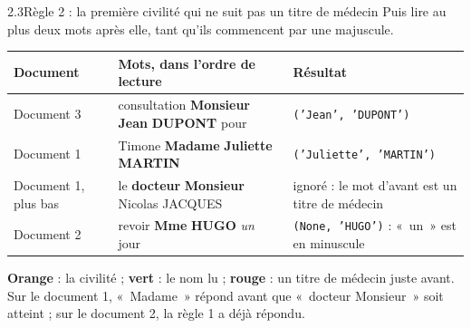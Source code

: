 \documentclass[11pt,aspectratio=169]{beamer}
\newcommand{\tok}[1]{\foreignlanguage{english}{\texttt{#1}}}
\newcommand{\civ}[1]{\textcolor{torange}{\bfseries #1}}   %
\newcommand{\nm}[1]{\textcolor{tgreen}{\bfseries #1}}     %
\newcommand{\drt}[1]{\textcolor{tred}{\bfseries #1}}      %
\newcommand{\ctx}[1]{\textcolor{mlgray}{#1}}              %
\begin{document}
\begin{frame}{2.3\quad Règle 2 : la première civilité qui ne suit pas un titre de médecin}
  Puis lire au plus deux mots après elle, tant qu'ils commencent par une majuscule.

  \vspace{0.8em}
  \begin{center}
    \small
    \renewcommand{\arraystretch}{1.25}
    \begin{tabular}{@{}L{2.0cm}L{5.4cm}L{5.4cm}@{}}
      \toprule
      \textbf{Document} & \textbf{Mots, dans l'ordre de lecture} & \textbf{Résultat} \\
      \midrule
      Document 3 & \ctx{consultation} \civ{Monsieur} \nm{Jean} \nm{DUPONT} \ctx{pour}
        & \tok{('Jean', 'DUPONT')} \\
      Document 1 & \ctx{Timone} \civ{Madame} \nm{Juliette} \nm{MARTIN}
        & \tok{('Juliette', 'MARTIN')} \\
      Document 1, plus bas & \ctx{le} \drt{docteur} \civ{Monsieur} Nicolas JACQUES
        & ignoré : le mot d'avant est un titre de médecin \\
      Document 2 & \ctx{revoir} \civ{Mme} \nm{HUGO} \ctx{\itshape un} \ctx{jour}
        & \tok{(None, 'HUGO')} : «~un~» est en minuscule \\
      \bottomrule
    \end{tabular}
  \end{center}

  \vspace{0.6em}
  \footnotesize
  \civ{Orange} : la civilité ; \nm{vert} : le nom lu ; \drt{rouge} : un titre de médecin juste
  avant. Sur le document 1, «~Madame~» répond avant que «~docteur Monsieur~» soit atteint ;
  sur le document 2, la règle 1 a déjà répondu.
\end{frame}
\end{document}

